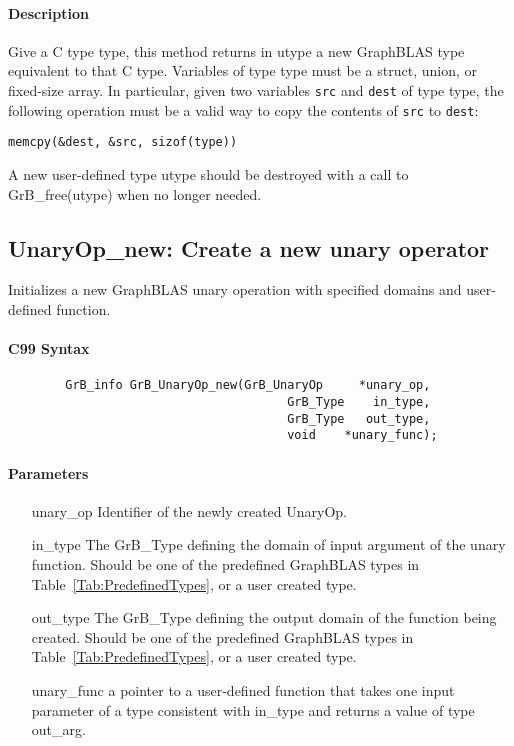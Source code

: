 \paragraph{Description}
Give a C type {\sf type}, this method returns in {\sf utype} a new GraphBLAS type equivalent to that C type.
Variables of type {\sf type} must be a struct, union, or fixed-size array. In particular, given two variables
{\tt src} and {\tt dest} of type {\sf type}, the following operation must be a valid way to copy the contents of
{\tt src} to {\tt dest}:

\begin{center}
{\tt memcpy(\&dest, \&src, sizof({\sf type}))}
\end{center}

A new user-defined type {\sf utype} should be destroyed with a call to {\sf GrB\_free(utype)} when no longer needed.

\subsection{{\sf UnaryOp\_new}: Create a new unary operator}

Initializes a new GraphBLAS unary operation with specified domains and user-defined function.


\paragraph{C99 Syntax}

\begin{verbatim}
        GrB_info GrB_UnaryOp_new(GrB_UnaryOp     *unary_op,
                                       GrB_Type    in_type,
                                       GrB_Type   out_type,
                                       void    *unary_func);
\end{verbatim}

\paragraph{Parameters}

\begin{itemize}[leftmargin=1.1in]
    \item[{\sf unary\_op}]      Identifier of the newly created UnaryOp.
        \item[{\sf in\_type}]        The {\sf GrB\_Type} defining the domain of input argument of
    the unary function. Should be one of the predefined
    GraphBLAS types in Table~\ref{Tab:PredefinedTypes}, or a user created type.
    \item[{\sf out\_type}]       The {\sf GrB\_Type} defining the output domain of the function
    being created.  Should be one of the predefined
    GraphBLAS types in Table~\ref{Tab:PredefinedTypes}, or a user created type.
    \item[{\sf unary\_func}]     a pointer to a user-defined function that takes one input 
    parameter of a type consistent with {\sf in\_type} and returns a value of type {\sf out\_arg}.
\end{itemize}


